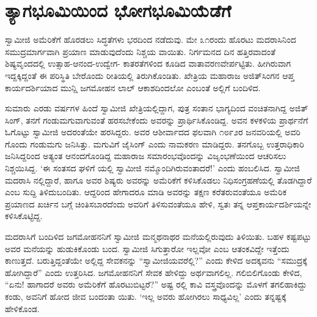 
\chapter{ತ್ಯಾಗಭೂಮಿಯಿಂದ ಭೋಗಭೂಮಿಯೆಡೆಗೆ}

\noindent

ಸ್ವಾಮೀಜಿ ಅಮೆರಿಕೆಗೆ ಹೊರಡಲು ಸಿದ್ಧತೆಗಳು ಭರದಿಂದ ನಡೆದುವು. ಮೇ ೩೧ರಂದು ಹೊರಟು ಮದರಾಸಿನಿಂದ ಸಮುದ್ರಮಾರ್ಗವಾಗಿ ಪ್ರಯಾಣ ಮಾಡುವುದೆಂದು ನಿಶ್ಚಯ ವಾಯಿತು. ನಿರ್ಗಮನದ ದಿನ ಹತ್ತಿರವಾದಂತೆ ಶಿಷ್ಯವೃಂದದಲ್ಲಿ ಉತ್ಸಾಹ-ಆನಂದ-ಉದ್ವೇಗ- ಕಾತರತೆಗಳಿಂದ ಕೂಡಿದ ವಾತಾವರಣವೇರ್ಪಟ್ಟಿತು. ಹೀಗಿರುವಾಗ ಇದ್ದಕ್ಕಿದ್ದಂತೆ ಈ ಪರಿಸ್ಥಿತಿ ಬೇರೊಂದು ರೀತಿಯಲ್ಲಿ ತಿರುಗಿಕೊಂಡಿತು. ಖೇತ್ರಿಯ ಮಹಾರಾಜ ಅಜಿತ್​ಸಿಂಗನ ಆಪ್ತ ಕಾರ್ಯದರ್ಶಿಯಾದ ಮುನ್ಷಿ ಜಗಮೋಹನ ಲಾಲ್ ಆಕಾಶದಿಂದಲೋ ಎಂಬಂತೆ ಅಲ್ಲಿಗೆ ಬಂದಿಳಿದ.

ಸುಮಾರು ಎರಡು ವರ್ಷಗಳ ಹಿಂದೆ ಸ್ವಾಮೀಜಿ ಖೇತ್ರಿಯಲ್ಲಿದ್ದಾಗ, ಪುತ್ರ ಸಂತಾನ ಭಾಗ್ಯದಿಂದ ವಂಚಿತನಾಗಿದ್ದ ಅಜಿತ್​ಸಿಂಗ್, ತನಗೆ ಗಂಡುಮಗುವಾಗುವಂತೆ ಹರಸಬೇಕೆಂದು ಅವರನ್ನು ಪ್ರಾರ್ಥಿಸಿಕೊಂಡಿದ್ದ. ಅವನ ಕಳಕಳಿಯ ಪ್ರಾರ್ಥನೆಗೆ ಓಗೊಟ್ಟು ಸ್ವಾಮೀಜಿ ಅದರಂತೆಯೇ ಹರಸಿದ್ದರು. ಅವರ ಆಶೀರ್ವಾದದ ಫಲವಾಗಿ ೧೮೯೨ರ ಜನವರಿಯಲ್ಲಿ ಅವರಿ ಗೊಂದು ಗಂಡುಮಗು ಜನಿಸಿತ್ತು. ಮಗುವಿಗೆ ಜೈಸಿಂಗ್ ಎಂದು ನಾಮಕರಣ ಮಾಡಿದ್ದರು. ತನಗೊಬ್ಬ ಉತ್ತರಾಧಿಕಾರಿ ಜನಿಸಿದ್ದರಿಂದ ಅತ್ಯಂತ ಆನಂದಗೊಂಡಿದ್ದ ಮಹಾರಾಜ ಸಮಾರಂಭವೊಂದನ್ನು ವಿಜೃಂಭಣೆಯಿಂದ ಆಚರಿಸಲು ನಿಶ್ಚಯಿಸಿದ್ದ. ‘ಈ ಸಂತಸದ ಘಳಿಗೆ ಯಲ್ಲಿ ಸ್ವಾಮೀಜಿ ನಮ್ಮೊಂದಿಗಿರುವಂತಾದರೆ!’ ಎಂದು ಹಂಬಲಿಸಿದ. ಸ್ವಾಮೀಜಿ ಮದರಾಸಿ ನಲ್ಲಿದ್ದಾರೆ, ಹಾಗೂ ಅವರ ಶಿಷ್ಯರು ಅವರನ್ನು ಅಮೆರಿಕೆಗೆ ಕಳಿಸಿಕೊಡಲು ನಿಧಿಸಂಗ್ರಹಣೆಯಲ್ಲಿ ತೊಡಗಿದ್ದಾರೆ ಎಂಬ ಸುದ್ದಿ ತಿಳಿದುಬಂದಿತು. ಆದ್ದರಿಂದ ಹೇಗಾದರೂ ಮಾಡಿ ಅವರನ್ನು ತಕ್ಷಣ ಕರೆತರುವಂತೆಯೂ ಅಮೆರಿಕ ಪ್ರಯಾಣದ ಖರ್ಚಿನ ಬಗ್ಗೆ ಚಿಂತಿಸಬಾರದೆಂದು ಅವರಿಗೆ ತಿಳಿಸುವಂತೆಯೂ ಹೇಳಿ, ಸ್ವತಃ ತನ್ನ ಆಪ್ತಕಾರ್ಯದರ್ಶಿಯನ್ನೇ ಕಳಿಸಿಕೊಟ್ಟಿದ್ದ.

ಮದರಾಸಿಗೆ ಬಂದಿಳಿದ ಜಗಮೋಹನನಿಗೆ ಸ್ವಾಮೀಜಿ ಮನ್ಮಥನಾಥರ ಮನೆಯಲ್ಲಿರುವುದು ತಿಳಿಯಿತು. ಬಹಳ ಕಷ್ಟಪಟ್ಟು ಅವರ ಮನೆಯನ್ನು ಹುಡುಕಿಕೊಂಡು ಬಂದ. ಸ್ವಾಮೀಜಿ ಸಿಗುತ್ತಾರೋ ಇಲ್ಲವೋ ಎಂಬ ಆತಂಕವಿದ್ದೇ ಇತ್ತೆಂದು ಕಾಣುತ್ತದೆ. ಬರುತ್ತಿದ್ದಂತೆಯೇ ಅಲ್ಲಿದ್ದ ಸೇವಕನನ್ನು “ಸ್ವಾಮೀಜಿಯವರೆಲ್ಲಿ?” ಎಂದು ಕೇಳಿದ ಅದಕ್ಕವನು “ಸಮುದ್ರಕ್ಕೆ ಹೋಗಿದ್ದಾರೆ” ಎಂದು ಉತ್ತರಿಸಿದ. ಜಗಮೋಹನನಿಗೆ ಸೇವಕ ಹೇಳಿದ್ದು ಅರ್ಥವಾಗಲಿಲ್ಲ. ಗಲಿಬಿಲಿಗೊಂಡು ಕೇಳಿದ, “ಏನು! ಹಾಗಾದರೆ ಅವರು ಅಮೆರಿಕೆಗೆ ಹೊರಟುಬಿಟ್ಟರೆ?” ಅಷ್ಟ ರಲ್ಲಿ ಕಾವಿ ವಸ್ತ್ರವೊಂದನ್ನು ಮೊಳಗೆ ತಗಲಿಹಾಕಿದ್ದು ಕಂಡು, ಅವನಿಗೆ ಹೋದ ಜೀವ ಬಂದಂತಾ ಯಿತು. ‘ಇಲ್ಲ ಅವರು ಹೋಗಿರಲು ಸಾಧ್ಯವಿಲ್ಲ’ ಎಂದು ತನ್ನಷ್ಟಕ್ಕೆ ಹೇಳಿಕೊಂಡ.

